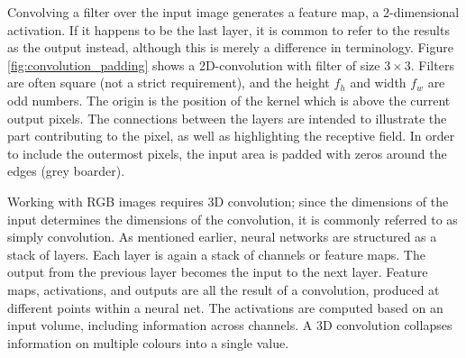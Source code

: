 
Convolving a filter over the input image generates a feature map, a 2-dimensional activation. If it happens to be the last layer, it is common to refer to the results as the output instead, although this is merely a difference in terminology. Figure \ref{fig:convolution_padding} shows a 2D-convolution with filter of size $3\times 3$. Filters are often square (not a strict requirement), and the height $f_h$ and width $f_w$ are odd numbers. The origin is the position of the kernel which is above the current output pixels. The connections between the layers are intended to illustrate the part contributing to the pixel, as well as highlighting the receptive field. In order to include the outermost pixels, the input area is padded with zeros around the edges (grey boarder). 


Working with RGB images requires 3D convolution; since the dimensions of the input determines the dimensions of the convolution, it is commonly referred to as simply convolution. As mentioned earlier, neural networks are structured as a stack of layers. Each layer is again a stack of channels or feature maps. The output from the previous layer becomes the input to the next layer. Feature maps, activations, and outputs are all the result of a convolution, produced at different points within a neural net. The activations are computed based on an input volume, including information across channels. A 3D convolution collapses information on multiple colours into a single value.

